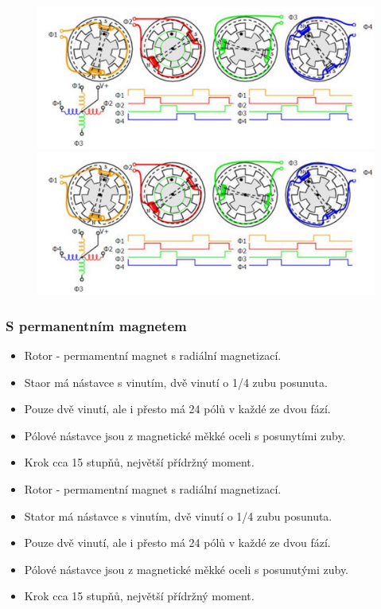 \begin{figure}[h]
  \begin{center}
    \includegraphics[scale = 1]{img/picture7.png}
  \end{center}
    \begin{center}
        \includegraphics[scale = 1]{img/picture7.png}
    \end{center}
\end{figure}

\subsubsection*{S permanentním magnetem}
\begin{itemize}
  \item Rotor - permamentní magnet s radiální magnetizací.
  \item Staor má nástavce s vinutím, dvě vinutí o 1/4 zubu posunuta.
  \item Pouze dvě vinutí, ale i přesto má 24 pólů v každé ze dvou fází.
  \item Pólové nástavce jsou z magnetické měkké oceli s posunytími zuby.
  \item Krok cca 15 stupňů, největší přídržný moment.
    \item Rotor - permamentní magnet s radiální magnetizací.
    \item Stator má nástavce s vinutím, dvě vinutí o 1/4 zubu posunuta.
    \item Pouze dvě vinutí, ale i přesto má 24 pólů v každé ze dvou fází.
    \item Pólové nástavce jsou z magnetické měkké oceli s posunutými zuby.
    \item Krok cca 15 stupňů, největší přídržný moment.
\end{itemize}

